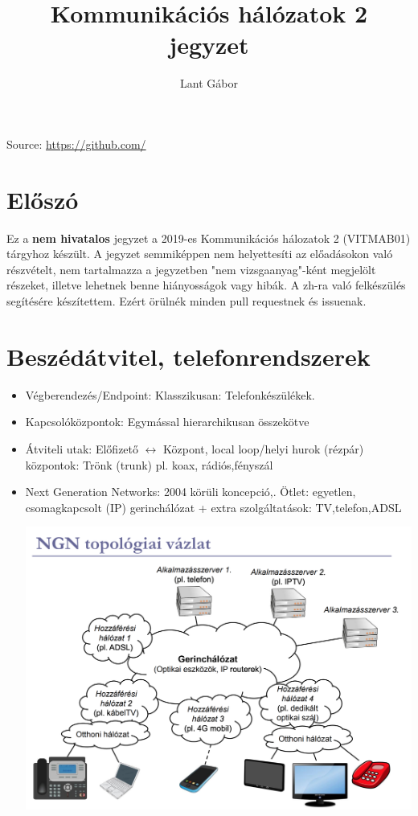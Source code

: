 \documentclass[10pt,a4paper]{article}
\title{Kommunikációs hálózatok 2 jegyzet}
\author{Lant Gábor}
\begin{document}
\maketitle
\noindent Source: \url{https://github.com/}
\tableofcontents
\section{Előszó}
Ez a \textbf{nem hivatalos} jegyzet a 2019-es Kommunikációs hálozatok 2 (VITMAB01) tárgyhoz készült. A jegyzet semmiképpen nem helyettesíti az előadásokon való részvételt, nem tartalmazza a jegyzetben "nem vizsgaanyag"-ként megjelölt részeket, illetve lehetnek benne hiányosságok vagy hibák. A zh-ra való felkészülés segítésére készítettem. Ezért örülnék minden pull requestnek és issuenak.
\newpage
\section{Beszédátvitel, telefonrendszerek}
\begin{itemize}
\item Végberendezés/Endpoint: Klasszikusan: Telefonkészülékek.\\
\item Kapcsolóközpontok: Egymással hierarchikusan összekötve\\
\item Átviteli utak: Előfizető $\leftrightarrow $ Központ, local loop/helyi hurok (rézpár)\\
központok: Trönk (trunk) pl. koax, rádiós,fényszál
\item Next Generation Networks: 2004 körüli koncepció,. Ötlet: egyetlen, csomagkapcsolt (IP) gerinchálózat + extra szolgáltatások: TV,telefon,ADSL
\begin{center}
	\includegraphics[width=0.9\linewidth]{src/NNG}
\end{center}
\end{itemize}
\end{document}
